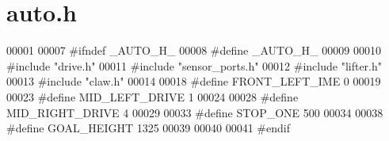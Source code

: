 \section{auto.\+h}
\label{auto_8h_source}

\begin{DoxyCode}
00001 
00007 \textcolor{preprocessor}{#ifndef \_AUTO\_H\_}
00008 \textcolor{preprocessor}{#define \_AUTO\_H\_}
00009 
00010 \textcolor{preprocessor}{#include "drive.h"}
00011 \textcolor{preprocessor}{#include "sensor_ports.h"}
00012 \textcolor{preprocessor}{#include "lifter.h"}
00013 \textcolor{preprocessor}{#include "claw.h"}
00014 
00018 \textcolor{preprocessor}{#define FRONT\_LEFT\_IME 0}
00019 
00023 \textcolor{preprocessor}{#define MID\_LEFT\_DRIVE 1}
00024 
00028 \textcolor{preprocessor}{#define MID\_RIGHT\_DRIVE 4}
00029 
00033 \textcolor{preprocessor}{#define STOP\_ONE 500}
00034 
00038 \textcolor{preprocessor}{#define GOAL\_HEIGHT 1325}
00039 
00040 
00041 \textcolor{preprocessor}{#endif}
\end{DoxyCode}
